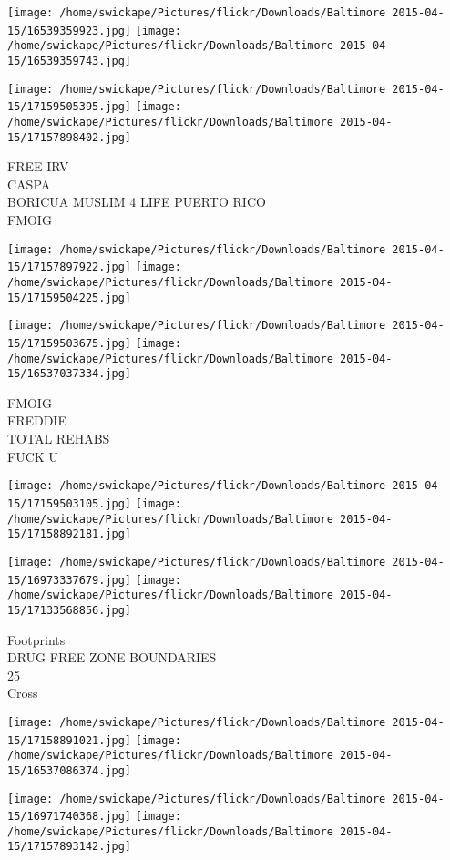 \documentclass[10pt,letterpaper]{article}
\begin{document}
\texttt{[image: /home/swickape/Pictures/flickr/Downloads/Baltimore 2015-04-15/16539359923.jpg]}
\texttt{[image: /home/swickape/Pictures/flickr/Downloads/Baltimore 2015-04-15/16539359743.jpg]}

\texttt{[image: /home/swickape/Pictures/flickr/Downloads/Baltimore 2015-04-15/17159505395.jpg]}
\texttt{[image: /home/swickape/Pictures/flickr/Downloads/Baltimore 2015-04-15/17157898402.jpg]}

FREE IRV\\
CASPA\\
BORICUA MUSLIM 4 LIFE PUERTO RICO\\
FMOIG
\pagebreak

\texttt{[image: /home/swickape/Pictures/flickr/Downloads/Baltimore 2015-04-15/17157897922.jpg]}
\texttt{[image: /home/swickape/Pictures/flickr/Downloads/Baltimore 2015-04-15/17159504225.jpg]}

\texttt{[image: /home/swickape/Pictures/flickr/Downloads/Baltimore 2015-04-15/17159503675.jpg]}
\texttt{[image: /home/swickape/Pictures/flickr/Downloads/Baltimore 2015-04-15/16537037334.jpg]}

FMOIG\\
FREDDIE\\
TOTAL REHABS\\
FUCK U
\pagebreak

\texttt{[image: /home/swickape/Pictures/flickr/Downloads/Baltimore 2015-04-15/17159503105.jpg]}
\texttt{[image: /home/swickape/Pictures/flickr/Downloads/Baltimore 2015-04-15/17158892181.jpg]}

\texttt{[image: /home/swickape/Pictures/flickr/Downloads/Baltimore 2015-04-15/16973337679.jpg]}
\texttt{[image: /home/swickape/Pictures/flickr/Downloads/Baltimore 2015-04-15/17133568856.jpg]}

Footprints\\
DRUG FREE ZONE BOUNDARIES\\
25\\
Cross
\pagebreak

\texttt{[image: /home/swickape/Pictures/flickr/Downloads/Baltimore 2015-04-15/17158891021.jpg]}
\texttt{[image: /home/swickape/Pictures/flickr/Downloads/Baltimore 2015-04-15/16537086374.jpg]}

\texttt{[image: /home/swickape/Pictures/flickr/Downloads/Baltimore 2015-04-15/16971740368.jpg]}
\texttt{[image: /home/swickape/Pictures/flickr/Downloads/Baltimore 2015-04-15/17157893142.jpg]}
\end{document}
